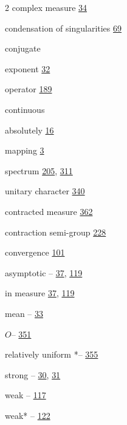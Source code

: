 \begin{multicols}{2}
\noindent complex measure \hyperlink{page.34}{34}\par
\noindent condensation of singularities \hyperlink{page.69}{69}\par
\noindent conjugate\par
\hspace*{1.1em}exponent \hyperlink{page.32}{32}\par
\hspace*{1.1em}operator \hyperlink{page.189}{189}\par
\noindent continuous\par
\hspace*{1.1em}absolutely \hyperlink{page.16}{16}\par
\hspace*{1.1em}mapping \hyperlink{page.3}{3}\par
\hspace*{1.1em}spectrum \hyperlink{page.205}{205}, \hyperlink{page.311}{311}\par
\hspace*{1.1em}unitary character \hyperlink{page.340}{340}\par
\noindent contracted measure \hyperlink{page.362}{362}\par
\noindent contraction semi-group \hyperlink{page.228}{228}\par
\noindent convergence \hyperlink{page.101}{101}\par
\hspace*{1.1em}asymptotic -- \hyperlink{page.37}{37}, \hyperlink{page.119}{119}\par
\hspace*{1.1em}in measure \hyperlink{page.37}{37}, \hyperlink{page.119}{119}\par
\hspace*{1.1em}mean -- \hyperlink{page.33}{33}\par
\hspace*{1.1em}$O$-- \hyperlink{page.351}{351}\par
\hspace*{1.1em}relatively uniform *-- \hyperlink{page.355}{355}\par
\hspace*{1.1em}strong -- \hyperlink{page.30}{30}, \hyperlink{page.31}{31}\par
\hspace*{1.1em}weak -- \hyperlink{page.117}{117}\par
\hspace*{1.1em}weak* -- \hyperlink{page.122}{122}\par

\end{multicols}
